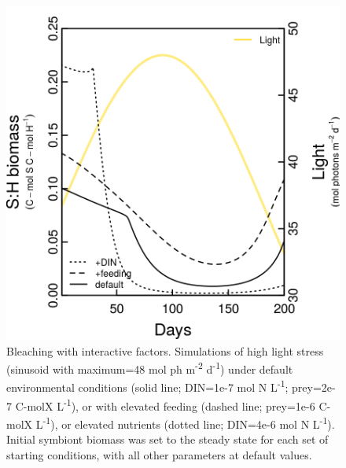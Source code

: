 \documentclass[]{elsarticle} %
\makeatletter
\def\maxwidth{\ifdim\Gin@nat@width>\linewidth\linewidth
\else\Gin@nat@width\fi}
\let\Oldincludegraphics\includegraphics
\renewcommand{\includegraphics}[1]{\Oldincludegraphics[width=\maxwidth]{#1}}
\makeatother
\begin{document}
\begin{figure}[htbp]
\centering
\includegraphics{../img/Fig7.png}
\caption{Bleaching with interactive factors. Simulations of high light
stress (sinusoid with maximum=48 mol ph m\textsuperscript{-2}
d\textsuperscript{-1}) under default environmental conditions (solid
line; DIN=1e-7 mol N L\textsuperscript{-1}; prey=2e-7 C-molX
L\textsuperscript{-1}), or with elevated feeding (dashed line; prey=1e-6
C-molX L\textsuperscript{-1}), or elevated nutrients (dotted line;
DIN=4e-6 mol N L\textsuperscript{-1}). Initial symbiont biomass was set
to the steady state for each set of starting conditions, with all other
parameters at default values.}
\end{figure}
\end{document}
